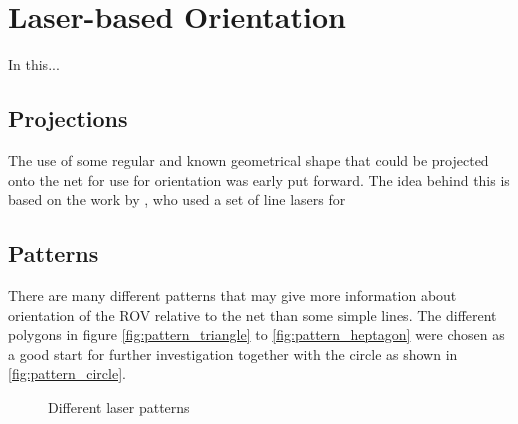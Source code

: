 

\chapter{Laser-based Orientation}
In this...

\section{Projections}
The use of some regular and known geometrical shape that could be projected onto the net for use for orientation 
was early put forward. The idea behind this is based on the work by \citet{carlsen10}, who used 
a set of line lasers for 

\section{Patterns}
There are many different patterns that may give more information about 
orientation of the ROV relative to the net than some simple lines. The 
different polygons in figure \vref{fig:pattern_triangle} to \vref{fig:pattern_heptagon}
were chosen as a good start for further investigation together with the 
circle as shown in \vref{fig:pattern_circle}.

\begin{figure}[htbp]
	\hfill
	\hfill
	\hfill
	\hfill
	\hfill
	\hfill
	\caption{Different laser patterns}
	\label{fig:laser_pattern}
\end{figure}

